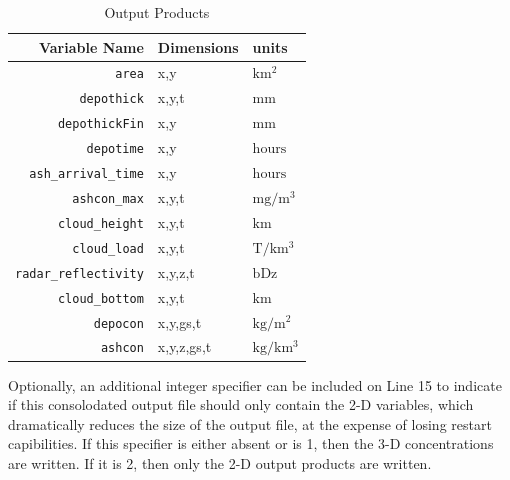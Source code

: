 \small
\begin{table}[htbp]
\begin{center}
\begin{tabular}{|r|l|l|}
\hline
Variable Name                & Dimensions & units\\
\hline
\texttt{area}                & x,y        & $\mathrm{km^2}$   \\
\texttt{depothick}           & x,y,t      & $\mathrm{mm}$     \\
\texttt{depothickFin}        & x,y        & $\mathrm{mm}$     \\
\texttt{depotime}            & x,y        & $\mathrm{hours}$  \\
\texttt{ash\_arrival\_time}  & x,y        & $\mathrm{hours}$  \\
\texttt{ashcon\_max}         & x,y,t      & $\mathrm{mg/m^3}$ \\
\texttt{cloud\_height}       & x,y,t      & $\mathrm{km}$     \\
\texttt{cloud\_load}         & x,y,t      & $\mathrm{T/km^3}$ \\
\texttt{radar\_reflectivity} & x,y,z,t    & $\mathrm{bDz}$    \\
\texttt{cloud\_bottom}       & x,y,t      & $\mathrm{km}$     \\
\texttt{depocon}             & x,y,gs,t   & $\mathrm{kg/m^2}$ \\
\texttt{ashcon}              & x,y,z,gs,t & $\mathrm{kg/km^3}$\\
\hline
\end{tabular}
\caption{\label{tab:OutputProduct}Output Products}
\end{center}
\end{table}
\normalsize

Optionally, an additional integer specifier can be included on
Line 15 to indicate if this consolodated output file should only contain the
2-D variables, which dramatically reduces the size of the output file, at the
expense of losing restart capibilities.
If this specifier is either absent or is 1, then the 3-D concentrations are written.
If it is 2, then only the 2-D output products are written.

